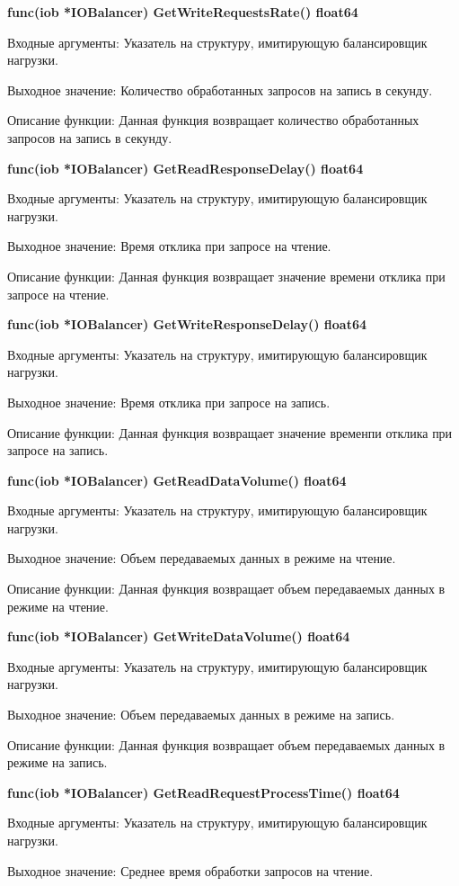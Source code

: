 \textbf{func(iob *IOBalancer) GetWriteRequestsRate() float64}

Входные аргументы: Указатель на структуру, имитирующую балансировщик нагрузки.

Выходное значение: Количество обработанных запросов на запись в секунду. 

Описание функции: Данная функция возвращает количество обработанных запросов на запись в секунду.

\textbf{func(iob *IOBalancer) GetReadResponseDelay() float64}

Входные аргументы: Указатель на структуру, имитирующую балансировщик нагрузки.

Выходное значение: Время отклика при запросе на чтение. 

Описание функции: Данная функция возвращает значение времени отклика при запросе на чтение.

\textbf{func(iob *IOBalancer) GetWriteResponseDelay() float64}

Входные аргументы: Указатель на структуру, имитирующую балансировщик нагрузки.

Выходное значение: Время отклика при запросе на запись.

Описание функции: Данная функция возвращает значение временпи отклика при запросе на запись.

\textbf{func(iob *IOBalancer) GetReadDataVolume() float64}

Входные аргументы: Указатель на структуру, имитирующую балансировщик нагрузки.

Выходное значение: Объем передаваемых данных в режиме на чтение.

Описание функции: Данная функция возвращает объем передаваемых данных в режиме на чтение.

\textbf{func(iob *IOBalancer) GetWriteDataVolume() float64}

Входные аргументы: Указатель на структуру, имитирующую балансировщик нагрузки.

Выходное значение: Объем передаваемых данных в режиме на запись. 

Описание функции: Данная функция возвращает объем передаваемых данных в режиме на запись.

\textbf{func(iob *IOBalancer) GetReadRequestProcessTime() float64}

Входные аргументы: Указатель на структуру, имитирующую балансировщик нагрузки.

Выходное значение: Среднее время обработки запросов на чтение.

